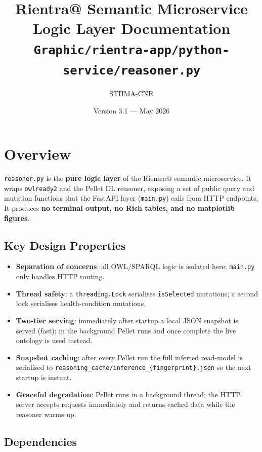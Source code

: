 ﻿\documentclass[12pt,a4paper]{article}
\title{\textbf{Rientra@ Semantic Microservice}\\[0.4em]
       \large Logic Layer Documentation\\[0.4em]
       \normalsize \texttt{Graphic/rientra-app/python-service/reasoner.py}}
\author{STIIMA-CNR}
\date{Version 3.1 --- May 2026}
\begin{document}
\begin{titlepage}\centering\maketitle\end{titlepage}
\tableofcontents
\newpage

\clearpage
\section{Overview}

\texttt{reasoner.py} is the \textbf{pure logic layer} of the Rientra@ semantic microservice. It wraps \texttt{owlready2} and the Pellet DL reasoner, exposing a set of public query and mutation functions that the FastAPI layer (\texttt{main.py}) calls from HTTP endpoints. It produces \textbf{no terminal output, no Rich tables, and no matplotlib figures}.

\subsection{Key Design Properties}

\begin{itemize}[noitemsep]
  \item \textbf{Separation of concerns}: all OWL/SPARQL logic is isolated here; \texttt{main.py} only handles HTTP routing.
  \item \textbf{Thread safety}: a \texttt{threading.Lock} serialises \texttt{isSelected} mutations; a second lock serialises health-condition mutations.
  \item \textbf{Two-tier serving}: immediately after startup a local JSON snapshot is served (fast); in the background Pellet runs and once complete the live ontology is used instead.
  \item \textbf{Snapshot caching}: after every Pellet run the full inferred read-model is serialised to \texttt{reasoning\_cache/inference\_\{fingerprint\}.json} so the next startup is instant.
  \item \textbf{Graceful degradation}: Pellet runs in a background thread; the HTTP server accepts requests immediately and returns cached data while the reasoner warms up.
\end{itemize}

\subsection{Dependencies}
\end{document}
